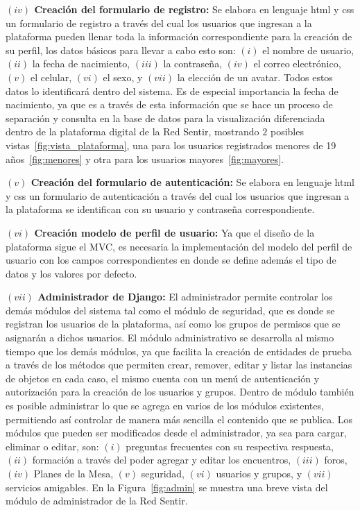 \documentclass[journal,transmag]{IEEEtran}
\begin{document}
\textbf{$(iv)$ Creación del formulario de registro:} Se elabora en lenguaje html y css un formulario de registro a través del cual los usuarios que ingresan a la plataforma pueden llenar toda la información correspondiente para la creación de su perfil, los datos básicos para llevar a cabo esto son: $(i)$ el nombre de usuario, $(ii)$ la fecha de nacimiento, $(iii)$ la contraseña, $(iv)$ el correo electrónico, $(v)$ el celular, $(vi)$ el sexo, y $(vii)$ la elección de un avatar. Todos estos datos lo identificará dentro del sistema. Es de especial importancia la fecha de nacimiento, ya que es a través de esta información que se hace un proceso de separación y consulta en la base de datos para la visualización diferenciada dentro de la plataforma digital de la Red Sentir, mostrando $2$ posibles vistas~\ref{fig:vista_plataforma}, una para los usuarios registrados menores de 19 años~\ref{fig:menores} y otra para los usuarios mayores~\ref{fig:mayores}.

\textbf{$(v)$ Creación del formulario de autenticación:} Se elabora en lenguaje html y css un formulario de autenticación a través del cual los usuarios que ingresan a la plataforma se identifican con su usuario y contraseña correspondiente.

\textbf{$(vi)$ Creación modelo de perfil de usuario:} Ya que el diseño de la plataforma sigue el MVC, es necesaria la implementación del modelo del perfil de usuario con los campos correspondientes en donde se define además el tipo de datos y los valores por defecto.

\textbf{$(vii)$ Administrador de Django:} El administrador permite controlar los demás módulos del sistema tal como el módulo de seguridad, que es donde se registran los usuarios de la plataforma, así como los grupos de permisos que se asignarán a dichos usuarios. El módulo administrativo se desarrolla al mismo tiempo que los demás módulos, ya que facilita la creación de entidades de prueba a través de los métodos que permiten crear, remover, editar y listar  las instancias de objetos en cada caso, el mismo cuenta con un menú de autenticación y autorización para la creación de los usuarios y grupos. Dentro de módulo también es posible administrar lo que se agrega en varios de los módulos existentes, permitiendo así controlar de manera más sencilla el contenido que se publica. Los módulos que pueden ser modificados desde el administrador, ya sea para cargar, eliminar o editar, son: $(i)$ preguntas frecuentes con su respectiva respuesta, $(ii)$ formación a través del poder agregar y editar los encuentros, $(iii)$ foros, $(iv)$ Planes de la Mesa, $(v)$ seguridad, $(vi)$ usuarios y grupos, y $(vii)$ servicios amigables. En la Figura~\ref{fig:admin} se muestra una breve vista del módulo de administrador de la Red Sentir.
\end{document}
